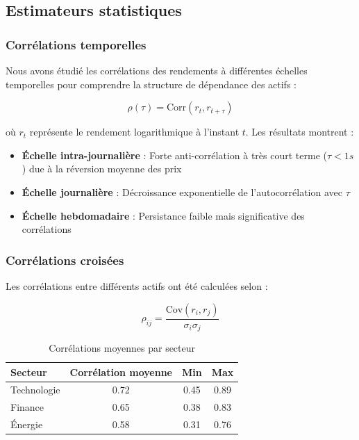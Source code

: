 \documentclass[12pt,a4paper]{article}
\theoremstyle{definition}
\theoremstyle{remark}
\begin{document}
\subsection{Estimateurs statistiques}

\subsubsection{Corrélations temporelles}

Nous avons étudié les corrélations des rendements à différentes échelles temporelles pour comprendre la structure de dépendance des actifs :

\begin{equation}
\rho(\tau) = \text{Corr}(r_t, r_{t+\tau})
\end{equation}

où $r_t$ représente le rendement logarithmique à l'instant $t$. Les résultats montrent :

\begin{itemize}
    \item \textbf{Échelle intra-journalière} : Forte anti-corrélation à très court terme ($\tau < 1s$) due à la réversion moyenne des prix
    \item \textbf{Échelle journalière} : Décroissance exponentielle de l'autocorrélation avec $\tau$
    \item \textbf{Échelle hebdomadaire} : Persistance faible mais significative des corrélations
\end{itemize}

\subsubsection{Corrélations croisées}

Les corrélations entre différents actifs ont été calculées selon :

\begin{equation}
\rho_{ij} = \frac{\text{Cov}(r_i, r_j)}{\sigma_i \sigma_j}
\end{equation}

\begin{table}[h!]
\centering
\begin{tabular}{lccc}
\toprule
Secteur & Corrélation moyenne & Min & Max \\
\midrule
Technologie & 0.72 & 0.45 & 0.89 \\
Finance & 0.65 & 0.38 & 0.83 \\
Énergie & 0.58 & 0.31 & 0.76 \\
\bottomrule
\end{tabular}
\caption{Corrélations moyennes par secteur}
\end{table}
\end{document}
